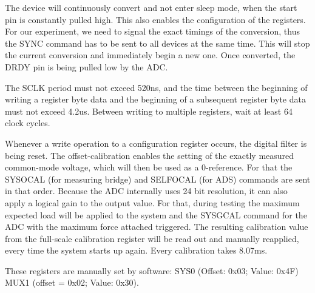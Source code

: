 The device will continuously convert and not enter sleep mode, when the start pin is constantly pulled high. This also enables the configuration of the registers. For our experiment, we need to signal the exact timings of the conversion, thus the SYNC command has to be sent to all devices at the same time. This will stop the current conversion and immediately begin a new one. Once converted, the DRDY pin is being pulled low by the ADC.

The SCLK period must not exceed 520ns, and the time between the beginning of writing a register byte data and the beginning of a subsequent register byte data must not exceed 4.2us. Between writing to multiple registers, wait at least 64 clock cycles.

Whenever a write operation to a configuration register occurs, the digital filter is being reset. The offset-calibration enables the setting of the exactly measured common-mode voltage, which will then be used as a 0-reference. For that the SYSOCAL (for measuring bridge) and SELFOCAL (for ADS) commands are sent in that order. Because the ADC internally uses 24 bit resolution, it can also apply a logical gain to the output value. For that, during testing the maximum expected load will be applied to the system and the SYSGCAL command for the ADC with the maximum force attached triggered. The resulting calibration value from the full-scale calibration register will be read out and manually reapplied, every time the system starts up again. Every calibration takes 8.07ms.

These registers are manually set by software: SYS0 (Offset: 0x03; Value: 0x4F) MUX1 (offset = 0x02; Value: 0x30).
